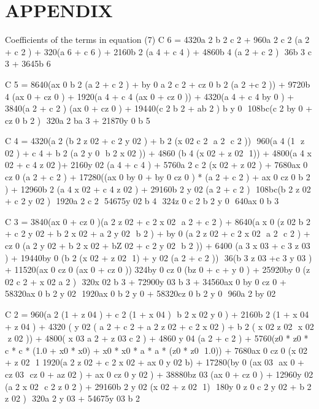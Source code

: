 
\chapter{APPENDIX} %

\label{AppendixA} %


Coefficients of the terms in equation (7) 
C 6  = 4320a 2 b 2 c 2  + 960a 2 c 2 (a 2  + c 2 ) + 320(a 6  + c 6 ) + 2160b 2 (a 4  + c 4 ) + 4860b 4 (a 2  
+ c 2 ) ­ 36b 3 c 3 + 3645b 6
  
C 5  = 8640(ax 0  b 2 (a 2  + c 2 ) + by 0 a 2  c 2  + cz 0 b 2 (a 2 +c 2 )) + 9720b 4 (ax 0  + cz 0 ) + 1920(a 4  
+ c 4 (ax 0  + cz 0 )) + 4320(a 4  + c 4 by 0 ) + 3840(a 2  + c 2 ) (ax 0  + cz 0 ) + 19440(c 2 b 2  + ab 2 ) 
b y 0  ­ 108bc(c 2 by 0  + cz 0 b 2 ) ­ 320a 2 ba 3  + 21870y 0 b 5  

C 4  = 4320(a 2 (b 2  z 02  + c 2 y 02 ) + b 2 (x 02 c 2  ­ a 2 ­ c 2 )) ­ 960(a 4 (1 ­ z 02 ) + c 4  + b 2 (a 2 y 0 ­ 
b 2 x 02 )) + 4860 (b 4 (x 02 + z 02  ­ 1)) + 4800(a 4 x 02 + c 4 z 02 )+ 2160y 02 (a 4 + c 4 ) + 
5760a 2 c 2 (x 02  + z 02 ) + 7680ax 0 cz 0 (a 2  + c 2 ) + 17280((ax 0 by 0  + by 0 cz 0 ) * (a 2 + c 2 ) + 
ax 0 cz 0  b 2 ) + 12960b 2 (a 4 x 02  + c 4 z 02 ) + 29160b 2 y 02 (a 2 + c 2 ) ­ 108bc(b 2 z 02  + c 2 y 02 ) ­ 
1920a 2 c 2  ­ 54675y 02 b 4  ­ 324z 0 c 2 b 2 y 0  ­ 640ax 0 b 3    

C 3  = 3840(ax 0  + cz 0 )(a 2 z 02  + c 2  x 02   ­ a 2  + c 2  ) + 8640(a x 0 (z 02 b 2  + c 2 y 02 + b 2 x 02  + 
a 2 y 02  ­ b 2 ) + by 0  (a 2 z 02  + c 2 x 02 ­ a 2 ­ c 2 ) + cz 0  (a 2 y 02 + b 2 x 02 + bZ 02  + c 2 y 02  ­ b 2 )) + 6400 
(a 3 x 03  + c 3 z 03 ) + 19440by 0 (b 2 (x 02  + z 02 ­ 1) + y 02 (a 2  + c 2 )) ­ 36(b 3 z 03  +c 3 y 03 ) + 
11520(ax 0 cz 0 (ax 0  + cz 0 ))­ 324by 0 cz 0 (bz 0  + c + y 0 ) + 25920by 0 (z 02 c 2  + x 02 a 2 ) ­ 
320x 02 b 3  + 72900y 03 b 3  + 34560ax 0 by 0 cz 0  + 58320ax 0 b 2 y 02 ­ 1920ax 0 b 2  y 0  + 
58320cz 0 b 2 y 0  ­ 960a 2 by 02   

C 2  = 960(a 2  (1 + z 04 ) +  c 2  (1 + x 04 ) ­ b 2 x 02 y 0 ) + 2160b 2  (1 +  x 04 +  z 04 ) + 4320 ( y 02 ( 
a 2  +  c 2  +  a 2  z 02  + c 2 x 02 ) + b 2 ( x 02  z 02  ­  x 02  ­ z 02 )) + 4800( x 03  a 2  +  z 03 c 2 ) + 4860 y 04 (a 2 + c 2 ) + 5760(z0 * z0 * c * c * (1.0 + x0 * x0) + x0 * x0 * a * a * (z0 * z0 ­ 1.0)) 
+  7680ax 0 cz 0 (x 02 + z 02  ­ 1­ 1920(a 2 z 02  + c 2 x 02  + ax 0 y 02 b) + 17280(by 0 (ax 03  ­ ax 0  + 
cz 03  ­ cz 0  + az 02 ) + ax 0 cz 0 y 02 ) + 38880bz 03 (ax 0  + cz 0 ) + 12960y 02 (a 2 x 02 ­ c 2  z 0 2 ) + 
29160b 2 y 02 (x 02 + z 02  ­ 1) ­ 180y 0 z 0 c 2 y 02  + b 2 z 02 ) ­ 320a 2 y 03  + 54675y 03 b 2  

